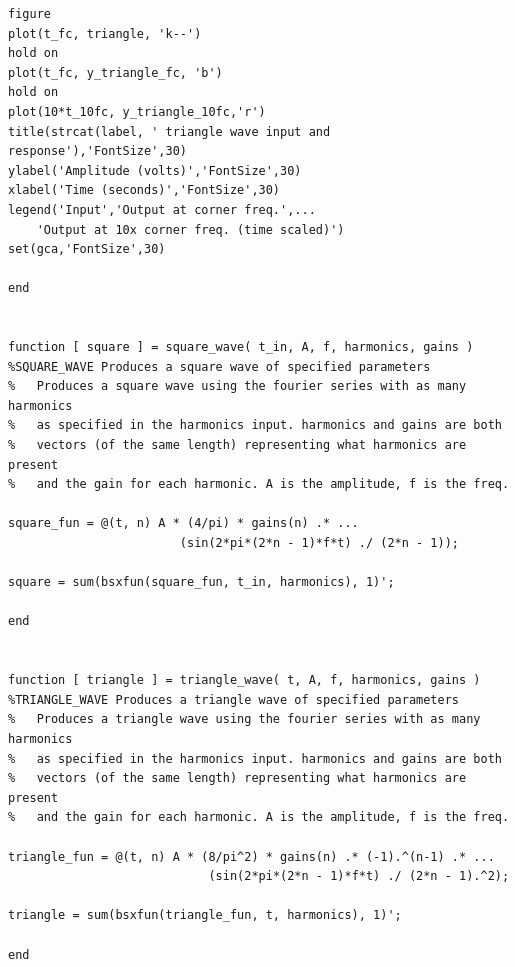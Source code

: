 \documentclass[12pt,letterpaper]{report}
\begin{document}
\begin{verbatim}
figure
plot(t_fc, triangle, 'k--')
hold on
plot(t_fc, y_triangle_fc, 'b')
hold on
plot(10*t_10fc, y_triangle_10fc,'r')
title(strcat(label, ' triangle wave input and response'),'FontSize',30)
ylabel('Amplitude (volts)','FontSize',30)
xlabel('Time (seconds)','FontSize',30)
legend('Input','Output at corner freq.',...
    'Output at 10x corner freq. (time scaled)')
set(gca,'FontSize',30)

end


function [ square ] = square_wave( t_in, A, f, harmonics, gains )
%SQUARE_WAVE Produces a square wave of specified parameters
%   Produces a square wave using the fourier series with as many harmonics
%   as specified in the harmonics input. harmonics and gains are both
%   vectors (of the same length) representing what harmonics are present
%   and the gain for each harmonic. A is the amplitude, f is the freq.

square_fun = @(t, n) A * (4/pi) * gains(n) .* ...
                        (sin(2*pi*(2*n - 1)*f*t) ./ (2*n - 1));

square = sum(bsxfun(square_fun, t_in, harmonics), 1)';

end


function [ triangle ] = triangle_wave( t, A, f, harmonics, gains )
%TRIANGLE_WAVE Produces a triangle wave of specified parameters
%   Produces a triangle wave using the fourier series with as many harmonics
%   as specified in the harmonics input. harmonics and gains are both
%   vectors (of the same length) representing what harmonics are present
%   and the gain for each harmonic. A is the amplitude, f is the freq.

triangle_fun = @(t, n) A * (8/pi^2) * gains(n) .* (-1).^(n-1) .* ...
                            (sin(2*pi*(2*n - 1)*f*t) ./ (2*n - 1).^2);

triangle = sum(bsxfun(triangle_fun, t, harmonics), 1)';

end
\end{verbatim}
\end{document}
